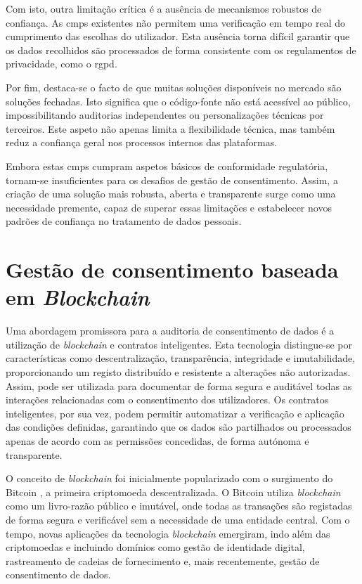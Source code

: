 Com isto, outra limitação crítica é a ausência de mecanismos robustos de confiança. As \acrshort{cmp}s existentes não permitem uma verificação em tempo real do cumprimento das escolhas do utilizador. Esta ausência torna difícil garantir que os dados recolhidos são processados de forma consistente com os regulamentos de privacidade, como o \acrshort{rgpd}.

Por fim, destaca-se o facto de que muitas soluções disponíveis no mercado são soluções fechadas. Isto significa que o código-fonte não está acessível ao público, impossibilitando auditorias independentes ou personalizações técnicas por terceiros. Este aspeto não apenas limita a flexibilidade técnica, mas também reduz a confiança geral nos processos internos das plataformas.

Embora estas \acrshort{cmp}s cumpram aspetos básicos de conformidade regulatória, tornam-se insuficientes para os desafios de gestão de consentimento. Assim, a criação de uma solução mais robusta, aberta e transparente surge como uma necessidade premente, capaz de superar essas limitações e estabelecer novos padrões de confiança no tratamento de dados pessoais.

\section{Gestão de consentimento baseada em \textit{{Blockchain}}}

Uma abordagem promissora para a auditoria de consentimento de dados é a utilização de \textit{blockchain} e contratos inteligentes. Esta tecnologia distingue-se por características como descentralização, transparência, integridade e imutabilidade, proporcionando um registo distribuído e resistente a alterações não autorizadas. Assim, pode ser utilizada para documentar de forma segura e auditável todas as interações relacionadas com o consentimento dos utilizadores. Os contratos inteligentes, por sua vez, podem permitir automatizar a verificação e aplicação das condições definidas, garantindo que os dados são partilhados ou processados apenas de acordo com as permissões concedidas, de forma autónoma e transparente.

O conceito de \textit{blockchain} foi inicialmente popularizado com o surgimento do Bitcoin \citep{nakamoto2008bitcoin}, a primeira criptomoeda descentralizada. O Bitcoin utiliza \textit{blockchain} como um livro-razão público e imutável, onde todas as transações são registadas de forma segura e verificável sem a necessidade de uma entidade central. Com o tempo, novas aplicações da tecnologia \textit{blockchain} emergiram, indo além das criptomoedas e incluindo domínios como gestão de identidade digital, rastreamento de cadeias de fornecimento e, mais recentemente, gestão de consentimento de dados.

